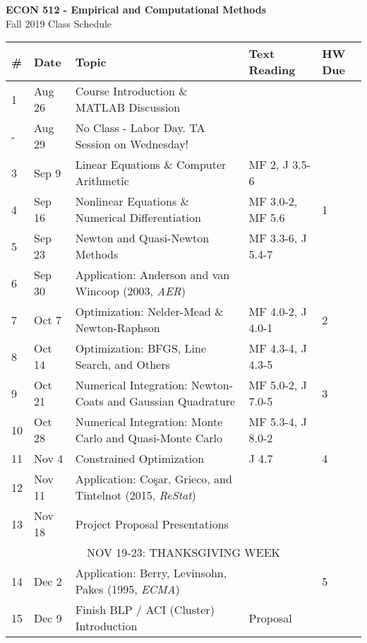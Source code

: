 \documentclass{article}
\begin{document}
\begin{center}
{\bf ECON 512 - Empirical and Computational Methods} \\
Fall 2019 Class Schedule 
\end{center}

\begin{center}
\begin{tabular}{l  l | l | l | l  }
\toprule
\# & Date & Topic & Text Reading & HW Due \\
\bottomrule
1 & Aug 26 & Course Introduction \& MATLAB Discussion &  & \\
-  & Aug 29 & No Class - Labor Day. TA Session on Wednesday! \\
3 & Sep 9 & Linear Equations \& Computer Arithmetic & MF 2, J 3.5-6 \\
4 & Sep 16  &  Nonlinear Equations \& Numerical Differentiation & MF 3.0-2, MF 5.6  & 1 \\ 
5 & Sep 23 & Newton and Quasi-Newton Methods & MF 3.3-6, J 5.4-7  & \\
6 & Sep 30 & Application: Anderson and van Wincoop (2003, \emph{AER})  &   \\
7 & Oct 7 & Optimization: Nelder-Mead \& Newton-Raphson & MF 4.0-2, J 4.0-1 & 2 \\
8 & Oct 14 & Optimization: BFGS, Line Search, and Others & MF 4.3-4, J 4.3-5 \\
9 & Oct 21 & Numerical Integration: Newton-Coats and Gaussian Quadrature & MF 5.0-2, J 7.0-5 & 3 \\
10 & Oct 28 & Numerical Integration: Monte Carlo and Quasi-Monte Carlo  & MF 5.3-4, J 8.0-2 &  \\
11 & Nov 4 & Constrained Optimization & J 4.7 &  4 \\
12 & Nov 11 & Application:  Co\c{s}ar, Grieco, and Tintelnot (2015, \emph{ReStat}) & &  \\
13 & Nov 18 & Project Proposal Presentations &  & \\ 
\multicolumn{5}{c}{NOV 19-23: THANKSGIVING WEEK } \\
14 & Dec 2 &  Application: Berry, Levinsohn, Pakes (1995, \emph{ECMA})  &   & 5  \\
15 & Dec 9  & Finish BLP / ACI (Cluster) Introduction & Proposal \\


\bottomrule
\end{tabular}
\end{center}
\end{document}
